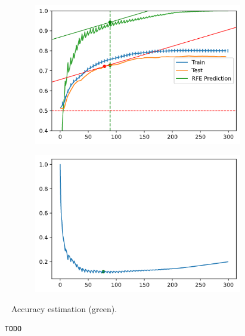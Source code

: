 \begin{figure}[h]
    \centering
    \begin{subfigure}[b]{0.4\linewidth}
        \includegraphics[width=\linewidth]{img/ch5/stopcond/main.png}
    \end{subfigure}
    \begin{subfigure}[b]{0.4\linewidth}
        \includegraphics[width=\linewidth]{img/ch5/stopcond/main-dual.png}
    \end{subfigure}
    \caption{Accuracy estimation (green).}
    \label{fig:ch5.stopcond.main}
\end{figure}

\begin{verbatim}
    TODO
\end{verbatim}



